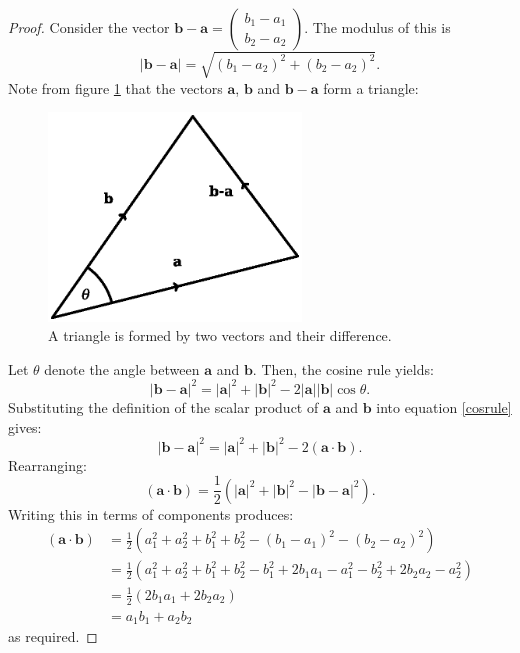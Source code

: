 \documentclass[12pt,a4paper]{article}
\theoremstyle{definition}
\theoremstyle{remark}
\newcommand{\bvec}[1]{\mathrm{\mathbf{#1}}}
\newcommand{\cvec}[2]{\begin{pmatrix} #1 \\ #2 \end{pmatrix}}
\newcommand{\vmod}[1]{{\lvert {#1} \rvert}}
\begin{document}
\begin{proof}
Consider the vector \(\bvec{b} - \bvec{a} = \cvec{b_1 - a_1}{b_2 - a_2}\). The modulus of this is
\[
\vmod{\bvec{b} - \bvec{a}} = \sqrt{(b_1 - a_2)^2 + (b_2 - a_2)^2}.
\] 
Note from figure \cref{triangle} that the vectors \(\bvec{a}\), \(\bvec{b}\) and \(\bvec{b}-\bvec{a}\) form a triangle: 
\begin{figure}[!h]
\begin{center}
\includegraphics[width=0.6\textwidth]{triangle.eps}
\end{center}
\caption{A triangle is formed by two vectors and their difference.}
\label{triangle}
\end{figure}

Let \(\theta\) denote the angle between \(\bvec{a}\) and \(\bvec{b}\). Then, the cosine rule yields:
\begin{equation}
\label{cosrule}
{\vmod{\bvec{b}-\bvec{a}}}^2 = {\vmod{\bvec{a}}}^2 + {\vmod{\bvec{b}}}^2 - 2\vmod{\bvec{a}}\vmod{\bvec{b}}\cos\theta. 
\end{equation} 
Substituting the definition of the scalar product of \(\bvec{a}\) and \(\bvec{b}\) into equation \cref{cosrule} gives:
\[
{\vmod{\bvec{b}-\bvec{a}}}^2 = {\vmod{\bvec{a}}}^2 + {\vmod{\bvec{b}}}^2 - 2\left(\bvec{a}\cdot \bvec{b}\right).
\] 
Rearranging:
\[
\left(\bvec{a}\cdot \bvec{b}\right) = \frac{1}{2}\left({\vmod{\bvec{a}}}^2 + {\vmod{\bvec{b}}}^2 - {\vmod{\bvec{b}-\bvec{a}}}^2\right).
\]
Writing this in terms of components produces:
\begin{align*}
\left(\bvec{a}\cdot \bvec{b}\right) &= \frac{1}{2}\left(a_1^2 + a_2^2 + b_1^2 + b_2^2 - (b_1 - a_1)^2 - (b_2 - a_2)^2\right)\\
\,&=\frac{1}{2}\left(a_1^2 + a_2^2 + b_1^2 + b_2^2 - b_1^2 + 2b_1a_1 - a_1^2 - b_2^2 + 2b_2a_2 - a_2^2\right)\\
\,&=\frac{1}{2}\left(2b_1a_1 + 2b_2a_2\right)\\
\,&=a_1b_1 + a_2b_2
\end{align*}
as required. 
\end{proof}
\end{document}
